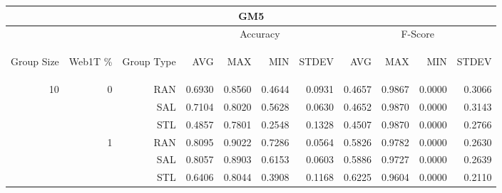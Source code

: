\begin{center}
\begin{table}[htbp]
\begin{tabular}{ | r | r | r | r | r | r | r | r | r | r | r |}
\hline
\multicolumn{11}{|c|}{GM5}\\
\hline
 & & & \multicolumn{4}{|c|}{Accuracy} & \multicolumn{4}{|c|}{F-Score}\\ \cline{4-11}
\begin{sideways}Group Size\end{sideways} & \begin{sideways}Web1T \%\end{sideways} & \begin{sideways}Group Type\end{sideways} & \begin{sideways}AVG\end{sideways} & \begin{sideways}MAX\end{sideways} & \begin{sideways}MIN\end{sideways} & \begin{sideways}STDEV\end{sideways} & \begin{sideways}AVG\end{sideways} & \begin{sideways}MAX\end{sideways} & \begin{sideways}MIN\end{sideways} & \begin{sideways}STDEV\end{sideways}\\
\hline
\multirow{18}{*}{10}
 & \multirow{3}{*}{0} & RAN & 0.6930 & 0.8560 & 0.4644 & 0.0931 & 0.4657 & 0.9867 & 0.0000 & 0.3066\\ \cline{3-11}
 &   & SAL & 0.7104 & 0.8020 & 0.5628 & 0.0630 & 0.4652 & 0.9870 & 0.0000 & 0.3143\\ \cline{3-11}
 &   & STL & 0.4857 & 0.7801 & 0.2548 & 0.1328 & 0.4507 & 0.9870 & 0.0000 & 0.2766\\ \cline{2-11}
 & \multirow{3}{*}{1} & RAN & 0.8095 & 0.9022 & 0.7286 & 0.0564 & 0.5826 & 0.9782 & 0.0000 & 0.2630\\ \cline{3-11}
 &   & SAL & 0.8057 & 0.8903 & 0.6153 & 0.0603 & 0.5886 & 0.9727 & 0.0000 & 0.2639\\ \cline{3-11}
 &   & STL & 0.6406 & 0.8044 & 0.3908 & 0.1168 & 0.6225 & 0.9604 & 0.0000 & 0.2110\\ \cline{2-11}

\end{tabular}
\end{table}
\end{center}
